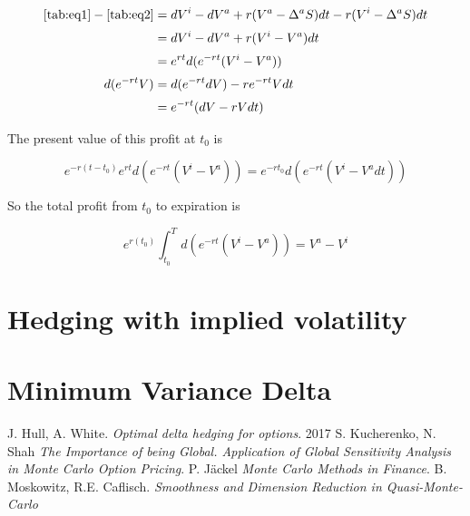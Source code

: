 \documentclass{article}
\begin{document}
\begin{center}
\begin{align*}
    \ref{tab:eq1} - \ref{tab:eq2} & = dV^i - dV^a + r(V^a - \Delta^a S) dt - r (V^i - \Delta^a S) dt \\[2pt]
                                  & = dV^i - dV^a + r(V^i - V^a) dt \\[2pt]
                                  & = e^{rt} d(e^{-rt} (V^i - V^a)) \\[2pt]
    d(e^{-rt}V)                   & = d(e^{-rt} dV) -r e^{-rt} V dt \\[2pt]
                                  & = e^{-rt} (dV -rV dt) \\
\end{align*}
\end{center}


The present value of this profit at $t_0$ is

\begin{center}
\begin{equation}
    e^{-r(t-t_0)} e^{rt} d(e^{-rt} (V^i - V^a)) = e^{-rt_0} d(e^{-rt} (V^i - V^a dt))
\end{equation}
\end{center}

So the total profit from $t_0$ to expiration is

\begin{center}
\begin{equation}
    e^{r(t_0)} \int_{t_0}^{T} d(e^{-rt} (V^i - V^a)) = V^a - V^i
\end{equation}
\end{center}


\newpage

\section{Hedging with implied volatility}

\section{Minimum Variance Delta}


\begin{thebibliography}{9}
J. Hull, A. White. \textit{Optimal delta hedging for options}. 2017
S. Kucherenko, N. Shah \textit{The Importance of being Global. Application of Global Sensitivity Analysis in Monte Carlo Option Pricing}.
P. J{\"a}ckel \textit{Monte Carlo Methods in Finance}.
B. Moskowitz, R.E. Caflisch. \textit{Smoothness and Dimension Reduction in Quasi-Monte-Carlo}
\end{thebibliography}
\end{document}
